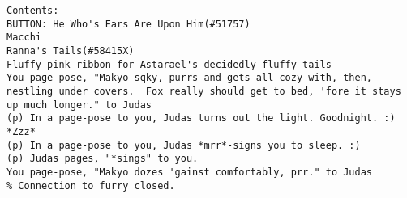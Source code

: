 \begin{verbatim}
Contents:
BUTTON: He Who's Ears Are Upon Him(#51757)
Macchi
Ranna's Tails(#58415X)
Fluffy pink ribbon for Astarael's decidedly fluffy tails
You page-pose, "Makyo sqky, purrs and gets all cozy with, then, nestling under covers.  Fox really should get to bed, 'fore it stays up much longer." to Judas
(p) In a page-pose to you, Judas turns out the light. Goodnight. :) *Zzz*
(p) In a page-pose to you, Judas *mrr*-signs you to sleep. :)
(p) Judas pages, "*sings" to you.
You page-pose, "Makyo dozes 'gainst comfortably, prr." to Judas
% Connection to furry closed.
\end{verbatim}
